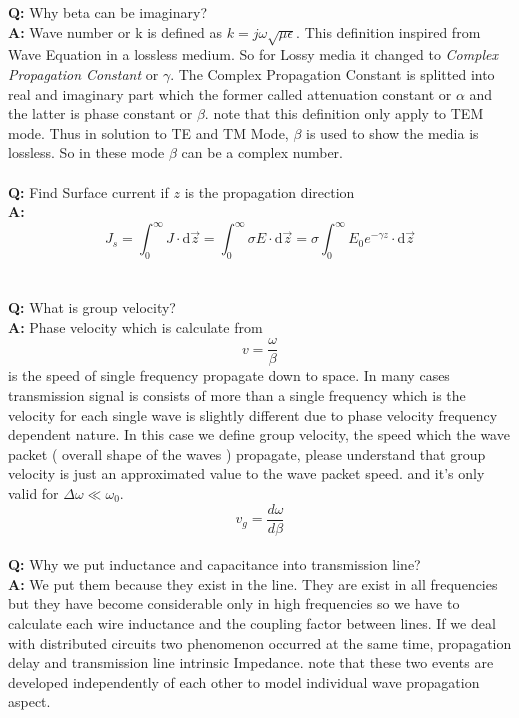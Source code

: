 \textbf{Q:} Why beta can be imaginary?\\
\textbf{A:} Wave number or k is defined as $ k = j \omega \sqrt{\mu \epsilon} $. This definition inspired from Wave Equation in a lossless medium. So for Lossy media it changed to {\it Complex Propagation Constant} or $\gamma$.  The Complex Propagation Constant is splitted into real and imaginary part which the former called attenuation constant or $\alpha$ and the latter is phase constant or $\beta$. note that this definition only apply to TEM mode. Thus in solution to TE and TM Mode, $\beta$ is used to show the media is lossless. So in these mode $\beta$ can be a complex number.
\\\\\textbf{Q:} Find Surface current if $z$ is the propagation direction\\
\textbf{A:} 
$$ J_s =  \int_{0}^{\infty}{ J } \cdot \mathrm{d}\vec{z} = \int_{0}^{\infty}{\sigma E} \cdot \mathrm{d}\vec{z} = \sigma \int_{0}^{\infty}{E_0 e^{-\gamma z}} \cdot \mathrm{d}\vec{z} $$
\\\\\textbf{Q:} What is group velocity?\\
\textbf{A:} Phase velocity which is calculate from\\
$$ v = \frac{\omega}{\beta} $$
is the speed of single frequency propagate down to space. In many cases transmission signal is consists of more than a single frequency which is the velocity for each single wave is slightly different due to phase velocity frequency dependent nature. In this case we define group velocity, the speed which the wave packet ( overall shape of the waves ) propagate, please understand that group velocity is just an approximated value to the wave packet speed. and it's only valid for $\Delta \omega \ll \omega_{0}$.\\
$$ v_g = \frac{d\omega}{d\beta} $$
\\\textbf{Q:} Why we put inductance and capacitance into transmission line?\\
\textbf{A:} We put them because they exist in the line. They are exist in all frequencies but they have become considerable only in high frequencies so we have to calculate each wire inductance and the coupling factor between lines. If we deal with distributed circuits two phenomenon occurred at the same time, propagation delay and transmission line intrinsic Impedance. note that these two events are developed independently of each other to model individual wave propagation aspect.
